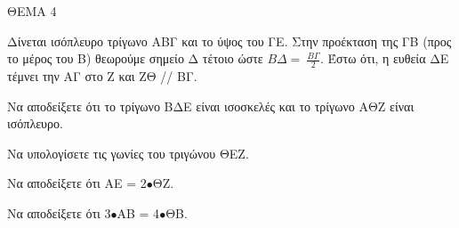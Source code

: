 
ΘΕΜΑ 4

Δίνεται ισόπλευρο τρίγωνο ΑΒΓ και το ύψος του ΓΕ. Στην προέκταση της ΓΒ (προς το μέρος του Β) θεωρούμε σημείο Δ τέτοιο ώστε $Β\Delta = \ \frac{Β\Gamma}{2}$. Έστω ότι, η ευθεία ΔΕ τέμνει την ΑΓ στο Ζ και ΖΘ // ΒΓ.

\begin{alist}
\item Να αποδείξετε ότι το τρίγωνο ΒΔΕ είναι ισοσκελές και το τρίγωνο ΑΘΖ είναι ισόπλευρο. 

\item Να υπολογίσετε τις γωνίες του τριγώνου ΘΕΖ. 

\item Να αποδείξετε ότι ΑΕ = 2$\bullet$ΘΖ. 

\item Να αποδείξετε ότι 3$\bullet$ΑΒ = 4$\bullet$ΘΒ. 


\end{alist}
